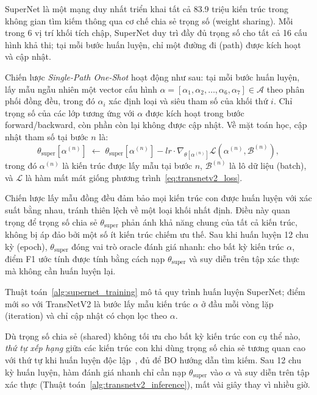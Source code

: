 SuperNet là một mạng duy nhất triển khai tất cả 83.9 triệu kiến trúc trong không gian tìm kiếm thông qua cơ chế chia sẻ trọng số (weight sharing). Mỗi trong 6 vị trí khối tích chập, SuperNet duy trì đầy đủ trọng số cho tất cả 16 cấu hình khả thi; tại mỗi bước huấn luyện, chỉ một đường đi (path) được kích hoạt và cập nhật.

Chiến lược \textit{Single-Path One-Shot} hoạt động như sau: tại mỗi bước huấn luyện, lấy mẫu ngẫu nhiên một vector cấu hình $\alpha = [\alpha_1, \alpha_2, \ldots, \alpha_6, \alpha_7] \in \mathcal{A}$ theo phân phối đồng đều, trong đó $\alpha_i$ xác định loại và siêu tham số của khối thứ $i$. Chỉ trọng số của các lớp tương ứng với $\alpha$ được kích hoạt trong bước forward/backward, còn phần còn lại không được cập nhật. Về mặt toán học, cập nhật tham số tại bước $n$ là:
\begin{equation}
    \theta_{\mathrm{super}}[\alpha^{(n)}]
    \;\leftarrow\;
    \theta_{\mathrm{super}}[\alpha^{(n)}] - lr \cdot \nabla_{\theta[\alpha^{(n)}]} \mathcal{L}(\alpha^{(n)}, \mathcal{B}^{(n)}),
    \label{eq:supernet_update}
\end{equation}
trong đó $\alpha^{(n)}$ là kiến trúc được lấy mẫu tại bước $n$, $\mathcal{B}^{(n)}$ là lô dữ liệu (batch), và $\mathcal{L}$ là hàm mất mát giống phương trình~\eqref{eq:transnetv2_loss}.

Chiến lược lấy mẫu đồng đều đảm bảo mọi kiến trúc con được huấn luyện với xác suất bằng nhau, tránh thiên lệch về một loại khối nhất định. Điều này quan trọng để trọng số chia sẻ $\theta_{\mathrm{super}}$ phản ánh khả năng chung của tất cả kiến trúc, không bị áp đảo bởi một số ít kiến trúc chiếm ưu thế. Sau khi huấn luyện 12 chu kỳ (epoch), $\theta_{\mathrm{super}}$ đóng vai trò oracle đánh giá nhanh: cho bất kỳ kiến trúc $\alpha$, điểm F1 ước tính được tính bằng cách nạp $\theta_{\mathrm{super}}$ và suy diễn trên tập xác thực mà không cần huấn luyện lại.

Thuật toán~\ref{alg:supernet_training} mô tả quy trình huấn luyện SuperNet; điểm mới so với TransNetV2 là bước lấy mẫu kiến trúc $\alpha$ ở đầu mỗi vòng lặp (iteration) và chỉ cập nhật có chọn lọc theo $\alpha$.

Dù trọng số chia sẻ (shared) không tối ưu cho bất kỳ kiến trúc con cụ thể nào, \textit{thứ tự xếp hạng} giữa các kiến trúc con khi dùng trọng số chia sẻ tương quan cao với thứ tự khi huấn luyện độc lập~\cite{ren2020_nas_survey}, đủ để BO hướng dẫn tìm kiếm. Sau 12 chu kỳ huấn luyện, hàm đánh giá nhanh chỉ cần nạp $\theta_{\mathrm{super}}$ vào $\alpha$ và suy diễn trên tập xác thực (Thuật toán~\ref{alg:transnetv2_inference}), mất vài giây thay vì nhiều giờ.


